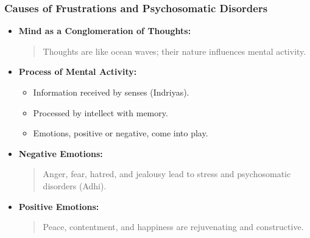 \begin{frame}[fragile]\frametitle{Causes of Frustrations and Psychosomatic Disorders}

      \begin{itemize}
        \item \textbf{Mind as a Conglomeration of Thoughts:}
        \begin{quote}
        Thoughts are like ocean waves; their nature influences mental activity.
        \end{quote}
        \item \textbf{Process of Mental Activity:}
        \begin{itemize}
            \item Information received by senses (Indriyas).
            \item Processed by intellect with memory.
            \item Emotions, positive or negative, come into play.
        \end{itemize}
        \item \textbf{Negative Emotions:}
        \begin{quote}
        Anger, fear, hatred, and jealousy lead to stress and psychosomatic disorders (Adhi).
        \end{quote}
        \item \textbf{Positive Emotions:}
        \begin{quote}
        Peace, contentment, and happiness are rejuvenating and constructive.
        \end{quote}
      \end{itemize}

\end{frame}

